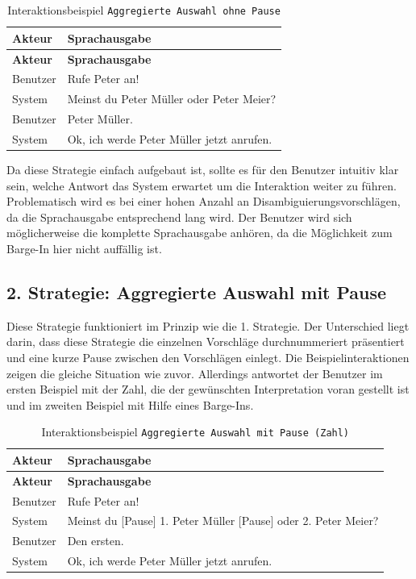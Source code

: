 \documentclass[12pt,a4paper]{scrartcl}
\begin{document}
\begin{longtable}{p{6cm}p{8cm}}
	\caption[Interaktionsbeispiel \texttt{Aggregierte Auswahl ohne Pause}]{Interaktionsbeispiel \texttt{Aggregierte Auswahl ohne Pause}}\\
	\hline
	\textbf{Akteur} &	\textbf{Sprachausgabe}\\
	\hline
	\endfirsthead
	\hline
	\textbf{Akteur} &	\textbf{Sprachausgabe}\\
	\hline
	\endhead
Benutzer & Rufe Peter an!\\
System & Meinst du Peter Müller oder Peter Meier?\\
Benutzer & Peter Müller.\\
System & Ok, ich werde Peter Müller jetzt anrufen.\\

\hline
\end{longtable}
	

Da diese Strategie einfach aufgebaut ist, sollte es für den Benutzer intuitiv klar sein, welche Antwort das System erwartet um die Interaktion weiter zu führen. Problematisch wird es bei einer hohen Anzahl an Disambiguierungsvorschlägen, da die Sprachausgabe entsprechend lang wird. Der Benutzer wird sich möglicherweise die komplette Sprachausgabe anhören, da die Möglichkeit zum Barge-In hier nicht auffällig ist. 
  

\subsection{2. Strategie: Aggregierte Auswahl mit Pause}
Diese Strategie funktioniert im Prinzip wie die 1. Strategie. Der Unterschied liegt darin, dass diese Strategie die einzelnen Vorschläge durchnummeriert präsentiert und eine kurze Pause zwischen den Vorschlägen einlegt. Die Beispielinteraktionen zeigen die gleiche Situation wie zuvor. Allerdings antwortet der Benutzer im ersten Beispiel mit der Zahl, die der gewünschten Interpretation voran gestellt ist und im zweiten Beispiel mit Hilfe eines Barge-Ins.\\

\begin{longtable}{p{6cm}p{8cm}}
	\caption[Interaktionsbeispiel \texttt{Aggregierte Auswahl mit Pause (Zahl)}]{Interaktionsbeispiel \texttt{Aggregierte Auswahl mit Pause (Zahl)}}\\
	\hline
	\textbf{Akteur} &	\textbf{Sprachausgabe}\\
	\hline
	\endfirsthead
	\hline
	\textbf{Akteur} &	\textbf{Sprachausgabe}\\
	\hline
	\endhead
Benutzer & Rufe Peter an!\\
System & Meinst du [Pause] 1. Peter Müller [Pause] oder 2. Peter Meier?\\
Benutzer & Den ersten.\\
System & Ok, ich werde Peter Müller jetzt anrufen.\\

\hline
\end{longtable}
\end{document}
